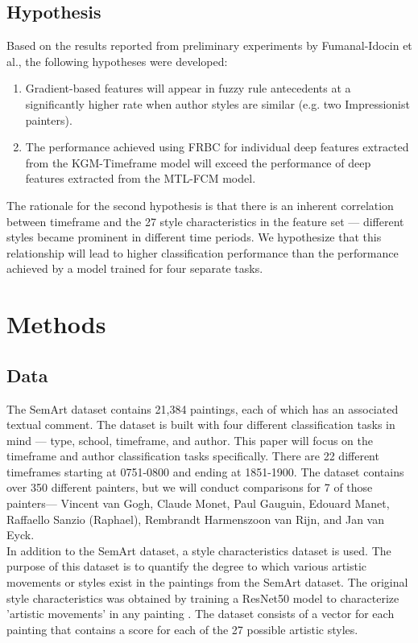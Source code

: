 \documentclass{article}
\begin{document}
\subsection{Hypothesis}
Based on the results reported from preliminary experiments by Fumanal-Idocin et al., the following hypotheses were developed: \\

\begin{enumerate}
    \item  Gradient-based features will appear in fuzzy rule antecedents at a significantly higher rate when author styles are similar (e.g. two Impressionist painters).
    \item The performance achieved using FRBC for individual deep features extracted from the KGM-Timeframe model will exceed the performance of deep features extracted from the MTL-FCM model.
\end{enumerate}
The rationale for the second hypothesis is that there is an inherent correlation between timeframe and the 27 style characteristics in the feature set --- different styles became prominent in different time periods. We hypothesize that this relationship will lead to higher classification performance than the performance achieved by a model trained for four separate tasks.


\section{Methods}

\subsection{Data}
The SemArt dataset \cite{SemArt} contains 21,384 paintings, each of which has an associated textual comment. The dataset is built with four different classification tasks in mind --- type, school, timeframe, and author. This paper will focus on the timeframe and author classification tasks specifically. There are 22 different timeframes starting at 0751-0800 and ending at 1851-1900. The dataset contains over 350 different painters, but we will conduct comparisons for 7 of those painters--- Vincent van Gogh, Claude Monet, Paul Gauguin, Edouard Manet, Raffaello Sanzio (Raphael), Rembrandt Harmenszoon van Rijn, and Jan van Eyck. \\

In addition to the SemArt dataset, a style characteristics dataset is used. The purpose of this dataset is to quantify the degree to which various artistic movements or styles exist in the paintings from the SemArt dataset. The original style characteristics was obtained by training a ResNet50 model to characterize 'artistic movements' in any painting \cite{lecoutre}. The dataset consists of a vector for each painting that contains a score for each of the 27 possible artistic styles. 
\end{document}
